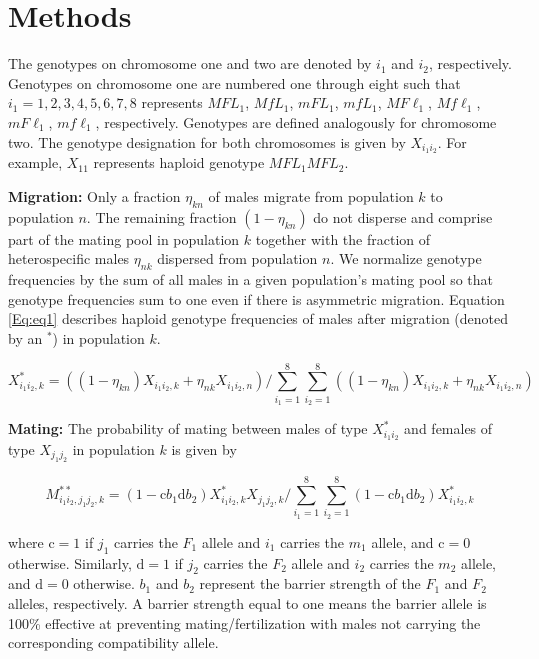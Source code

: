 \documentclass[11pt]{article}
\begin{document}
\section*{Methods}
The genotypes on chromosome one and two are denoted by $i_1$ and $i_2$, respectively.  Genotypes on chromosome one are numbered one through eight such that $i_1 = 1, 2, 3, 4, 5, 6, 7, 8$ represents $M F L_1$, $M f L_1$, $m F L_1$, $m f L_1$, $M F \ell_1$, $M f \ell_1$, $m F \ell_1$, $m f \ell_1$, respectively. Genotypes are defined analogously for chromosome two. The genotype designation for both chromosomes is given by $X_{i_1 i_2}$.  For example, $X_{1 1}$ represents haploid genotype $M F L_1 M F L_2$.

\noindent \textbf{Migration:} Only a fraction $\eta_{kn}$ of males migrate from population $k$ to population $n$.  The remaining fraction $(1-\eta_{kn})$ do not disperse and comprise part of the mating pool in population $k$ together with the fraction of heterospecific males $\eta_{nk}$ dispersed from population $n$.  We normalize genotype frequencies by the sum of all males in a given population's mating pool so that genotype frequencies sum to one even if there is asymmetric migration.  Equation \ref{Eq:eq1} describes haploid genotype frequencies of males after migration (denoted by an $^*$) in population $k$.  

\begin{equation}\label{Eq:eq1}
X^*_{{i_1 i_2}, k} = ((1 - \eta_{kn}) X_{{i_1 i_2}, k} + \eta_{nk} X_{{i_1 i_2}, n})/ \sum_{i_1 =1}^{8} \sum_{i_2=1}^{8} ((1 - \eta_{kn}) X_{{i_1 i_2}, k} + \eta_{nk} X_{{i_1 i_2}, n})
\end{equation}

\noindent \textbf{Mating:} The probability of mating between males of type $X^*_{i_1 i_2}$ and females of type $X_{j_1 j_2}$ in population $k$ is given by

\begin{equation}\label{Eq:eq2}
M^{**}_{i_1 i_2, j_1 j_2, k} = (1 - \text{c} b_1 \text{d} b_2) X^*_{i_1 i_2, k} X_{j_1 j_2, k}/ \sum_{i_1 =1}^{8} \sum_{i_2=1}^{8} (1 - \text{c} b_1 \text{d} b_2) X^*_{i_1 i_2, k}
\end{equation}

where $\text{c} = 1$ if $j_1$ carries the $F_1$ allele and $i_1$ carries the $m_1$ allele, and $\text{c} = 0$ otherwise.  Similarly, $\text{d} = 1$ if $j_2$ carries the $F_2$ allele and $i_2$ carries the $m_2$ allele, and $\text{d} = 0$ otherwise.  $b_1$ and $b_2$ represent the barrier strength of the $F_1$ and $F_2$ alleles, respectively. A barrier strength equal to one means the barrier allele is 100\% effective at preventing mating/fertilization with males not carrying the corresponding compatibility allele.  
\end{document}
